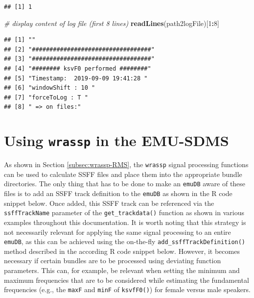 \documentclass[]{book}
\newenvironment{Shaded}{\begin{snugshade}}{\end{snugshade}}
\newcommand{\CommentTok}[1]{\textcolor[rgb]{0.56,0.35,0.01}{\textit{#1}}}
\newcommand{\DecValTok}[1]{\textcolor[rgb]{0.00,0.00,0.81}{#1}}
\newcommand{\KeywordTok}[1]{\textcolor[rgb]{0.13,0.29,0.53}{\textbf{#1}}}
\newcommand{\NormalTok}[1]{#1}
\newcommand{\OperatorTok}[1]{\textcolor[rgb]{0.81,0.36,0.00}{\textbf{#1}}}
\begin{document}
\begin{verbatim}
## [1] 1
\end{verbatim}

\begin{Shaded}
\begin{Highlighting}[]
\CommentTok{# display content of log file (first 8 lines)}
\KeywordTok{readLines}\NormalTok{(path2logFile)[}\DecValTok{1}\OperatorTok{:}\DecValTok{8}\NormalTok{]}
\end{Highlighting}
\end{Shaded}

\begin{verbatim}
## [1] ""                                  
## [2] "##################################"
## [3] "##################################"
## [4] "######## ksvF0 performed ########" 
## [5] "Timestamp:  2019-09-09 19:41:28 "  
## [6] "windowShift : 10 "                 
## [7] "forceToLog : T "                   
## [8] " => on files:"
\end{verbatim}

\hypertarget{sec:wrassp-emu-sdms}{%
\section{\texorpdfstring{Using \texttt{wrassp} in the EMU-SDMS}{Using wrassp in the EMU-SDMS}}\label{sec:wrassp-emu-sdms}}

As shown in Section \ref{subsec:wrassp-RMS}, the \texttt{wrassp} signal processing functions can be used to calculate SSFF files and place them into the appropriate bundle directories. The only thing that has to be done to make an \texttt{emuDB} aware of these files is to add an SSFF track definition to the \texttt{emuDB} as shown in the R code snippet below. Once added, this SSFF track can be referenced via the \texttt{ssffTrackName} parameter of the \texttt{get\_trackdata()} function as shown in various examples throughout this documentation. It is worth noting that this strategy is not necessarily relevant for applying the same signal processing to an entire \texttt{emuDB}, as this can be achieved using the on-the-fly \texttt{add\_ssffTrackDefinition()} method described in the according R code snippet below. However, it becomes necessary if certain bundles are to be processed using deviating function parameters. This can, for example, be relevant when setting the minimum and maximum frequencies that are to be considered while estimating the fundamental frequencies (e.g., the \texttt{maxF} and \texttt{minF} of \texttt{ksvfF0()}) for female versus male speakers.
\end{document}
